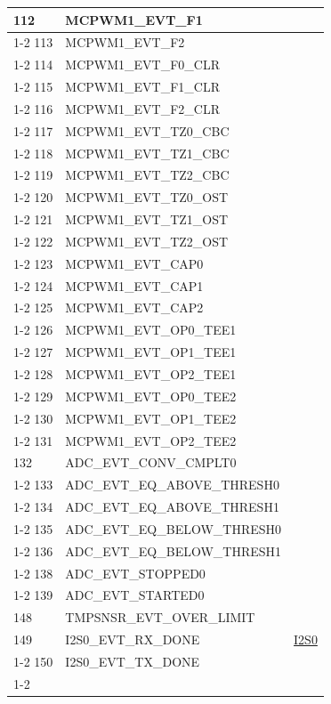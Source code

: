 \documentclass[main\_\_CN.tex]{subfiles}
\begin{document}
\begin{longtable}{ | l | l | l | }
112  & MCPWM1\_EVT\_F1     & \\ \cline{1-2}
113  & MCPWM1\_EVT\_F2     & \\ \cline{1-2}
114  & MCPWM1\_EVT\_F0\_CLR  & \\ \cline{1-2}
115  & MCPWM1\_EVT\_F1\_CLR  & \\ \cline{1-2}
116  & MCPWM1\_EVT\_F2\_CLR  & \\ \cline{1-2}
117  & MCPWM1\_EVT\_TZ0\_CBC & \\ \cline{1-2}
118  & MCPWM1\_EVT\_TZ1\_CBC & \\ \cline{1-2}
119  & MCPWM1\_EVT\_TZ2\_CBC & \\ \cline{1-2}
120  & MCPWM1\_EVT\_TZ0\_OST & \\ \cline{1-2}
121  & MCPWM1\_EVT\_TZ1\_OST & \\ \cline{1-2}
122  & MCPWM1\_EVT\_TZ2\_OST & \\ \cline{1-2}
123  & MCPWM1\_EVT\_CAP0   & \\ \cline{1-2}
124  & MCPWM1\_EVT\_CAP1   & \\ \cline{1-2}
125  & MCPWM1\_EVT\_CAP2   & \\ \cline{1-2}
126  & MCPWM1\_EVT\_OP0\_TEE1   & \\ \cline{1-2}
127  & MCPWM1\_EVT\_OP1\_TEE1   & \\ \cline{1-2}
128  & MCPWM1\_EVT\_OP2\_TEE1   & \\ \cline{1-2}
129  & MCPWM1\_EVT\_OP0\_TEE2   & \\ \cline{1-2}
130  & MCPWM1\_EVT\_OP1\_TEE2   & \\ \cline{1-2}
131  & MCPWM1\_EVT\_OP2\_TEE2   & \\ \hline
132  & ADC\_EVT\_CONV\_CMPLT0    & \nameref{mod:adc}   \\ \cline{1-2}
133  & ADC\_EVT\_EQ\_ABOVE\_THRESH0     & \\ \cline{1-2}
134  & ADC\_EVT\_EQ\_ABOVE\_THRESH1     & \\ \cline{1-2}
135  & ADC\_EVT\_EQ\_BELOW\_THRESH0     & \\ \cline{1-2}
136  & ADC\_EVT\_EQ\_BELOW\_THRESH1     & \\ \cline{1-2}
138  & ADC\_EVT\_STOPPED0 & \\ \cline{1-2}
139  & ADC\_EVT\_STARTED0 & \\ \hline
148 & TMPSNSR\_EVT\_OVER\_LIMIT & \nameref{mod:tmpsen}  \\ \hline
149 & I2S0\_EVT\_RX\_DONE & \hyperref[mod:i2s]{I2S0}   \\ \cline{1-2}
150 & I2S0\_EVT\_TX\_DONE & \\ \cline{1-2}

\end{longtable}
\end{document}
